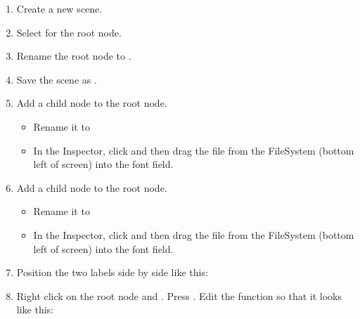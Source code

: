 \documentclass[letterpaper,10pt,english]{sphinxmanual}
\begin{document}
\label{\detokenize{tutorial:displaying-the-high-score-table}}\begin{enumerate}
%
\item {} 
\sphinxAtStartPar
Create a new scene.

\item {} 
\sphinxAtStartPar
Select  for the root node.

\item {} 
\sphinxAtStartPar
Rename the root node to .

\item {} 
\sphinxAtStartPar
Save the scene as .

\item {} 
\sphinxAtStartPar
Add a  child node to the root node.
\begin{itemize}
\item {} 
\sphinxAtStartPar
Rename it to 

\item {} 
\sphinxAtStartPar
In the Inspector, click  and then drag the
 file from the FileSystem (bottom left of screen)
into the \sphinxstylestrong{{[}empty{]}} font field.

\end{itemize}

\item {} 
\sphinxAtStartPar
Add a  child node to the root node.
\begin{itemize}
\item {} 
\sphinxAtStartPar
Rename it to 

\item {} 
\sphinxAtStartPar
In the Inspector, click  and then drag the
 file from the FileSystem (bottom left of screen)
into the \sphinxstylestrong{{[}empty{]}} font field.

\end{itemize}

\item {} 
\sphinxAtStartPar
Position the two labels side by side like this:

\sphinxAtStartPar
{} 

\item {} 
\sphinxAtStartPar
Right click on the root node and . Press .
Edit the  function so that it looks like this:

\end{enumerate}
\end{document}
